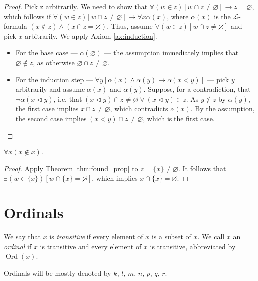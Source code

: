 \begin{proof}
    \leanok
    Pick z arbitrarily. 
    We need to show that $\forall (w \in z)[w \cap z \neq \varnothing] \rightarrow z = \varnothing$, 
    which follows if $\forall (w \in z)[w \cap z \neq \varnothing] \rightarrow \forall x \alpha(x)$, 
    where $\alpha(x)$ is the $\mathcal{L}$-formula $(x \notin z) \land (x \cap z = \varnothing)$.
    Thus, assume $\forall (w \in z)[w \cap z \neq \varnothing]$ and pick $x$ arbitrarily.
    We apply Axiom \ref{ax:induction}.
    \begin{itemize}
        \item For the base case — $\alpha (\varnothing)$ — the assumption immediately implies that 
        $\varnothing \notin z$, as otherwise $\varnothing \cap z \neq \varnothing$.
        \item For the induction step 
        — $\forall y[\alpha(x) \land \alpha(y) \rightarrow \alpha(x \lhd y)]$ — 
        pick $y$ arbitrarily and assume $\alpha(x)$ and $\alpha(y)$.
        Suppose, for a contradiction, that $\neg \alpha (x \lhd y)$, i.e. 
        that $(x \lhd y) \cap z \neq \varnothing \lor (x \lhd y) \in z$. 
        As $y \notin z$ by $\alpha(y)$, the first case implies $x \cap z \neq \varnothing$, 
        which contradicts $\alpha(x)$. 
        By the assumption, the second case implies $(x \lhd y) \cap z \neq \varnothing$, 
        which is the first case.
    \end{itemize}
\end{proof}

\begin{corollary}
    \label{cor:mem_irrefl}
    \leanok
    $\forall x (x \notin x)$.
\end{corollary}

\begin{proof}
    \leanok
    Apply Theorem \ref{thm:found_prop} to $z = \{x\}\neq \varnothing$.
    It follows that $\exists (w \in \{x\})[w\cap \{x\} = \varnothing]$, 
    which implies $x \cap \{x\} = \varnothing$.
\end{proof}

\section{Ordinals}

\begin{definition}
    \label{def:IsTrans+IsOrd}
    \leanok
    We say that $x$ is \textit{transitive} if every element of $x$ is a subset of $x$. 
    We call $x$ an \textit{ordinal} if $x$ is transitive and every element of $x$ is transitive, 
    abbreviated by $\operatorname{Ord}(x)$.

    Ordinals will be mostly denoted by $k$, $l$, $m$, $n$, $p$, $q$, $r$.
\end{definition}

